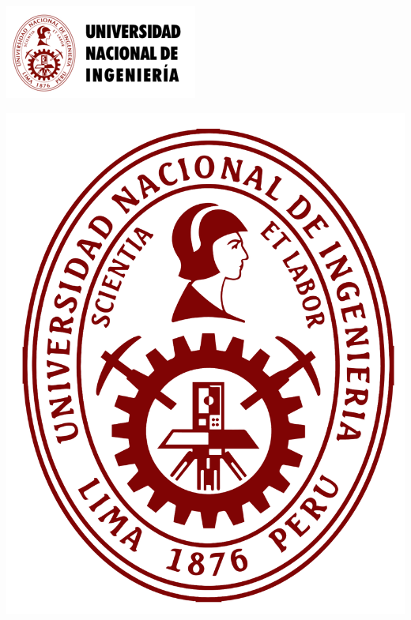 \begin{center}																		%
	\newcommand{\HRule}{\rule{\linewidth}{0.5mm}}									%
	\begin{minipage}{0.48\textwidth} \begin{flushleft}
			\includegraphics[scale = 0.9]{Imagenes/UNI_2.png}
		\end{flushleft}\end{minipage}
	\begin{minipage}{0.48\textwidth} \begin{flushright}
			\includegraphics[scale = 0.075]{Imagenes/UNI.png}
		\end{flushright}\end{minipage}


\end{center}
